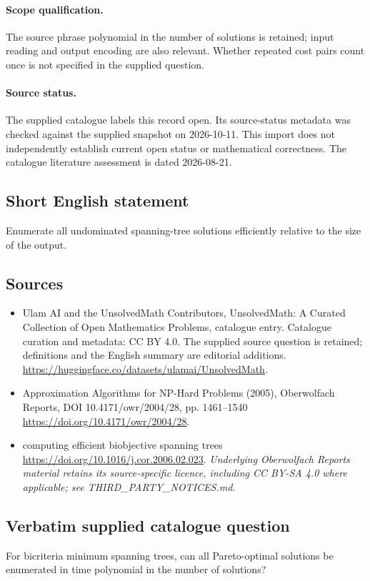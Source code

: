 \documentclass[11pt]{article}
\begin{document}
\paragraph{Scope qualification.}
The source phrase polynomial in the number of solutions is retained; input reading and output encoding are also relevant. Whether repeated cost pairs count once is not specified in the supplied question.
\paragraph{Source status.}
The supplied catalogue labels this record open. Its source-status metadata was checked against the supplied snapshot on 2026-10-11. This import does not independently establish current open status or mathematical correctness. The catalogue literature assessment is dated 2026-08-21.
\subsection{Short English statement}
Enumerate all undominated spanning-tree solutions efficiently relative to the size of the output.
\subsection{Sources}
\begin{itemize}
\item[S1] Ulam AI and the UnsolvedMath Contributors, UnsolvedMath: A Curated Collection of Open Mathematics Problems, catalogue entry. Catalogue curation and metadata: CC BY 4.0. The supplied source question is retained; definitions and the English summary are editorial additions.
\url{https://huggingface.co/datasets/ulamai/UnsolvedMath}.
\item[S2] Approximation Algorithms for NP-Hard Problems (2005), Oberwolfach Reports, DOI 10.4171/owr/2004/28, pp. 1461--1540
\url{https://doi.org/10.4171/owr/2004/28}.
\item[S3] computing efficient biobjective spanning trees
\url{https://doi.org/10.1016/j.cor.2006.02.023}.
\textit{Underlying Oberwolfach Reports material retains its source-specific licence, including CC BY-SA 4.0 where applicable; see THIRD\_PARTY\_NOTICES.md.}
\end{itemize}
\subsection{Verbatim supplied catalogue question}
For bicriteria minimum spanning trees, can all Pareto-optimal solutions be enumerated in time polynomial in the number of solutions?
\end{document}
